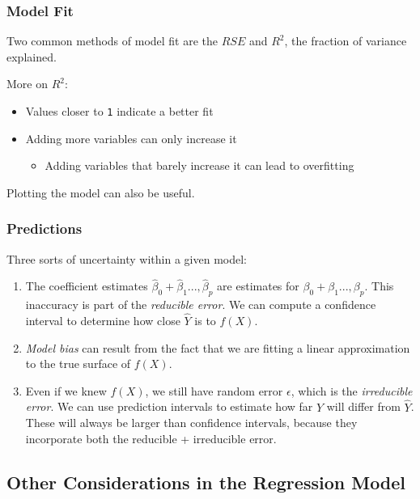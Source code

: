 \documentclass[]{book}
\providecommand{\tightlist}{%
  \setlength{\itemsep}{0pt}\setlength{\parskip}{0pt}}
\begin{document}
\hypertarget{model-fit}{%
\subsubsection{Model Fit}\label{model-fit}}

Two common methods of model fit are the \(RSE\) and \(R^2\), the fraction of variance explained.

More on \(R^2\):

\begin{itemize}
\tightlist
\item
  Values closer to \texttt{1} indicate a better fit
\item
  Adding more variables can only increase it

  \begin{itemize}
  \tightlist
  \item
    Adding variables that barely increase it can lead to overfitting
  \end{itemize}
\end{itemize}

Plotting the model can also be useful.

\hypertarget{predictions}{%
\subsubsection{Predictions}\label{predictions}}

Three sorts of uncertainty within a given model:

\begin{enumerate}
\def\labelenumi{\arabic{enumi}.}
\item
  The coefficient estimates \(\hat\beta_0 + \hat\beta_1...,\hat\beta_p\) are estimates for \(\beta_0 + \beta_1...,\beta_p\). This inaccuracy is part of the \emph{reducible error}. We can compute a confidence interval to determine how close \(\hat Y\) is to \(f(X)\).
\item
  \emph{Model bias} can result from the fact that we are fitting a linear approximation to the true surface of \(f(X)\).
\item
  Even if we knew \(f(X)\), we still have random error \(\epsilon\), which is the \emph{irreducible error}. We can use prediction intervals to estimate how far \(Y\) will differ from \(\hat Y\). These will always be larger than confidence intervals, because they incorporate both the reducible + irreducible error.
\end{enumerate}

\hypertarget{other-considerations-in-the-regression-model}{%
\subsection{Other Considerations in the Regression Model}\label{other-considerations-in-the-regression-model}}
\end{document}
